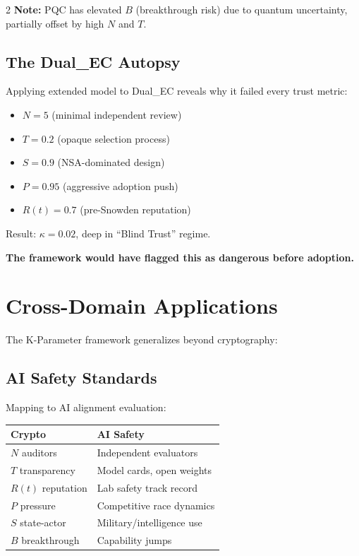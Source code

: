 \documentclass[11pt]{article}
\begin{document}
\begin{multicols}{2}
\textbf{Note:} PQC has elevated $B$ (breakthrough risk) due to quantum uncertainty, partially offset by high $N$ and $T$.

\subsection{The Dual\_EC Autopsy}

Applying extended model to Dual\_EC reveals why it failed every trust metric:

\begin{itemize}[noitemsep]
\item $N = 5$ (minimal independent review)
\item $T = 0.2$ (opaque selection process)
\item $S = 0.9$ (NSA-dominated design)
\item $P = 0.95$ (aggressive adoption push)
\item $R(t) = 0.7$ (pre-Snowden reputation)
\end{itemize}

Result: $\kappa = 0.02$, deep in ``Blind Trust'' regime.

\textbf{The framework would have flagged this as dangerous before adoption.}

\section{Cross-Domain Applications}

The K-Parameter framework generalizes beyond cryptography:

\subsection{AI Safety Standards}

Mapping to AI alignment evaluation:

\begin{center}
\small
\begin{tabular}{@{}ll@{}}
\toprule
\textbf{Crypto} & \textbf{AI Safety} \\
\midrule
$N$ auditors & Independent evaluators \\
$T$ transparency & Model cards, open weights \\
$R(t)$ reputation & Lab safety track record \\
$P$ pressure & Competitive race dynamics \\
$S$ state-actor & Military/intelligence use \\
$B$ breakthrough & Capability jumps \\
\bottomrule
\end{tabular}
\end{center}


\end{multicols}
\end{document}
